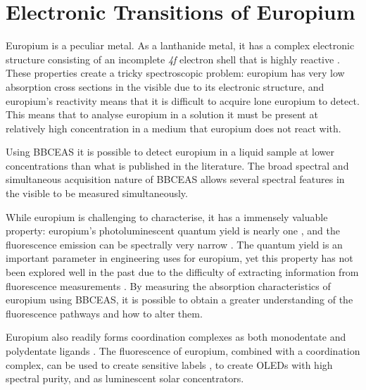 \chapter{Electronic Transitions of Europium}\label{ch:eu_theory}

Europium is a peculiar metal. As a lanthanide metal, it has a complex
electronic structure consisting of an incomplete \textsl{4f} electron shell
that is highly reactive \cite{Cooley:1946tv,Rard:1985tb}. These properties
create a tricky spectroscopic problem: europium has very low absorption cross
sections in the visible due to its electronic structure, and europium's
reactivity means that it is difficult to acquire lone europium to detect. This
means that to analyse europium in a solution it must be present at relatively
high concentration in a medium that europium does not react with.


Using \ac{BBCEAS} it is possible to detect europium in a liquid sample at lower
concentrations than what is published in the literature.  The broad spectral
and simultaneous acquisition nature of \ac{BBCEAS} allows several spectral
features in the visible to be measured simultaneously.

While europium is challenging to characterise, it has a immensely valuable
property: europium's photoluminescent quantum yield is nearly one
\cite{Scotognella:2009jo,Moudam:2009in, Bunzli:2005ic}, and the fluorescence
emission can be spectrally very narrow \cite{Werts:2002fs}. The quantum yield
is an important parameter in engineering uses for europium, yet this property
has not been explored well in the past due to the difficulty of extracting
information from fluorescence measurements \cite{Werts:2002fs}. By measuring
the absorption characteristics of europium using \ac{BBCEAS}, it is possible to
obtain a greater understanding of the fluorescence pathways and how to alter
them.

Europium also readily forms coordination complexes as both monodentate and
polydentate ligands
\cite{Kirby:1983cl,Sveshnikova:2000cr,Werts:2002fs,Bunzli:2005ic,Scotognella:2009jo,Moudam:2009in}. The fluorescence of europium, combined with a coordination complex, can be used
to create sensitive labels
\cite{Harma:2010dm,Pihlasalo:2010el,InstituteofBiomedicine:2011vt,Pihlasalo:2011ju,Pihlasalo:2012cq,Pihlasalo:2012en},
to create OLEDs with high spectral purity\cite{Moudam:2009in}, and as
luminescent solar concentrators\cite{Moudam:2009in,Wilson:2010hs}.

